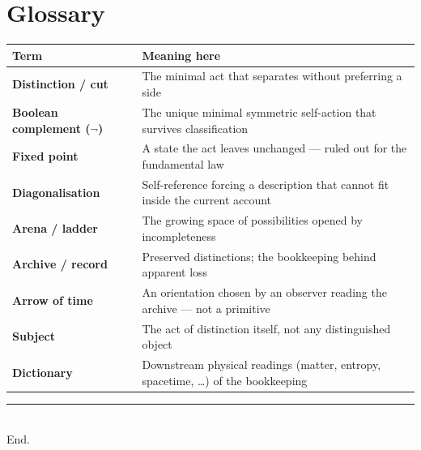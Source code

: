 \documentclass[11pt,a4paper]{article}
\newcommand{\Neg}{\ensuremath{\neg}}
\begin{document}
\vspace{0.45em}
\section*{Glossary}

\renewcommand{\arraystretch}{1.18}
{\footnotesize
\begin{tabularx}{\textwidth}{@{}>{\bfseries\sffamily\color{accent}}l X@{}}
\toprule
Term & Meaning here \\
\midrule
Distinction / cut
  & The minimal act that separates without preferring a side \\
Boolean complement ($\Neg$)
  & The unique minimal symmetric self-action that survives classification \\
Fixed point
  & A state the act leaves unchanged --- ruled out for the fundamental law \\
Diagonalisation
  & Self-reference forcing a description that cannot fit inside the current account \\
Arena / ladder
  & The growing space of possibilities opened by incompleteness \\
Archive / record
  & Preserved distinctions; the bookkeeping behind apparent loss \\
Arrow of time
  & An orientation chosen by an observer reading the archive --- not a primitive \\
Subject
  & The act of distinction itself, not any distinguished object \\
Dictionary
  & Downstream physical readings (matter, entropy, spacetime, \ldots)
    of the bookkeeping \\
\bottomrule
\end{tabularx}
}

\vspace{0.55em}
\begin{center}
  {\color{rule}\rule{0.25\textwidth}{0.4pt}}\\[0.3em]
  {\color{muted}\scriptsize End.}
\end{center}
\end{document}
